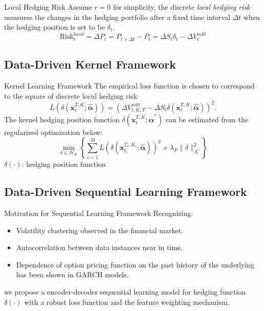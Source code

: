 \documentclass[10pt,table,mathserif]{beamer}
\newcommand{\vx}{\mathbf{x}}
\newcommand{\HK}{\mathcal{H}_K}
\newcommand{\DS}{\Delta S}
\newcommand{\DT}{\Delta t}
\newcommand{\valpha}{\pmb{\widehat{\alpha}}}
\newcommand{\Smkt}{S}
\begin{document}
\begin{frame}{Local  Hedging Risk }
Assume $r=0$ for simplicity, the  discrete {\em local hedging risk} measures  the changes in the hedging portfolio after a fixed time interval $\DT$ when the hedging position is set to be $\delta_{t}$.  
\begin{equation}
	\label{eq:localPL}
    \text{Risk}^{local}_{t}=\Delta P_{t}=P_{t+\DT}-P_{t}=\Delta \Smkt_{t}\delta_{t} -\Delta V^{mkt}_{t}
\end{equation}





\end{frame}
\subsection{Data-Driven Kernel Framework}
\begin{frame}{Kernel Learning Framework}
The empirical loss function is chosen to correspond to the square of discrete local hedging risk
\begin{equation}\label{eq:HR}
L\left(\delta(\vx_{t}^{T,K};\valpha)\right)=\left(\Delta V^{mkt}_{t,K,T}-\DS_{t} \delta(\vx_{t}^{T,K};\valpha)\right)^2.
\end{equation}
The kernel hedging position function $\delta(\vx_{t}^{T,K};\valpha^*)$  can be estimated from  the regularized optimization below:
\begin{equation} \label{fhedge}
\min_{\delta \in \HK}\left\{\sum_{i=1}^M L\left(\delta(\vx_{t_i}^{T_i,K_i};\valpha)\right)^2+\lambda_P \|\delta\|^2_\mathcal{K}\right\}
\end{equation}
$\delta(\cdot)$: hedging position function
\end{frame}



\subsection{Data-Driven Sequential Learning Framework}
\begin{frame}{Motivation for Sequential Learning Framework}
Recognizing:
\begin{itemize}
  \item Volatility clustering observed in the financial market.
  \item Autocorrelation between data instances near in time.
  \item Dependence of option pricing function on the past history of the underlying has been shown in GARCH models.
\end{itemize}
we propose a encoder-decoder sequential learning model for hedging function $\delta(\cdot)$  with a robust loss function and the feature weighting mechanism.
\end{frame}
\end{document}
